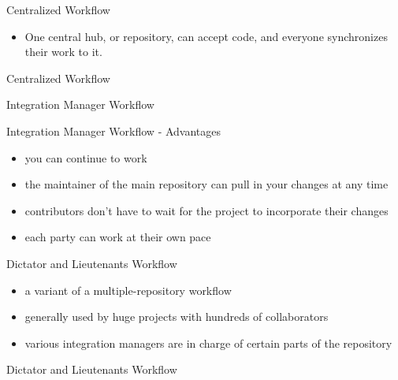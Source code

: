 \documentclass{beamer}
\begin{document}
\begin{frame}{Centralized Workflow}
  \begin{itemize}
  \item
    One central hub, or repository, can accept code, and everyone synchronizes their work to it.
  \end{itemize}
\end{frame}

\begin{frame}{Centralized Workflow}
    \centering
    \hfill\vfill
\end{frame}

\begin{frame}{Integration Manager Workflow}
    \centering
    \hfill\vfill
\end{frame}

\begin{frame}{Integration Manager Workflow - Advantages}
  \begin{itemize}
  \item
    you can continue to work
  \item
    the maintainer of the main repository can pull in your changes at any time
  \item
    contributors don't have to wait for the project to incorporate their changes
  \item
    each party can work at their own pace
  \end{itemize}
\end{frame}

\begin{frame}{Dictator and Lieutenants Workflow}
  \begin{itemize}
  \item
    a variant of a multiple-repository workflow
  \item
    generally used by huge projects with hundreds of collaborators
  \item
    various integration managers are in charge of certain parts of the repository
  \end{itemize}
\end{frame}

\begin{frame}{Dictator and Lieutenants Workflow}
    \centering
    \hfill\vfill
\end{frame}
\end{document}
